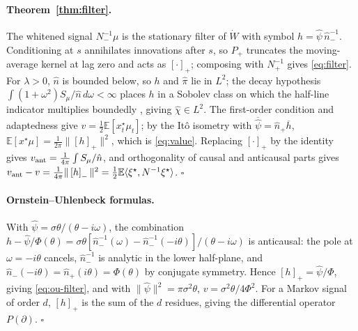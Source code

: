 \documentclass[11pt]{article}
\newcommand{\E}{\mathbb{E}}
\newcommand{\pluspart}[1]{\left[#1\right]_+}
\newcommand{\minuspart}[1]{\left[#1\right]_-}
\theoremstyle{plain}
\theoremstyle{definition}
\theoremstyle{remark}
\begin{document}
\paragraph{Theorem~\ref{thm:filter}.} The whitened signal $N_-^{-1}\mu$ is the stationary filter of $\dot W$ with symbol $h=\hat\psi\,\hat n_-^{-1}$. Conditioning at $s$ annihilates innovations after $s$, so $P_+$ truncates the moving-average kernel at lag zero and acts as $\pluspart{\cdot}$; composing with $N_+^{-1}$ gives \eqref{eq:filter}. For $\lambda>0$, $\hat n$ is bounded below, so $h$ and $\hat\pi$ lie in $L^2$; the decay hypothesis $\int(1+\omega^2)S_\mu/\hat n\,d\omega<\infty$ places $h$ in a Sobolev class on which the half-line indicator multiplies boundedly \citep[Ch.~1]{LionsMagenes1972}, giving $\hat\chi\in L^2$. The first-order condition and adaptedness give $v=\tfrac12\E[x^\star_t\mu_t]$; by the It\^o isometry with $\overline{\hat\psi}=\hat n_+\overline h$, $\E[x^\star\mu]=\tfrac1{2\pi}\|\pluspart{h}\|^2$, which is \eqref{eq:value}. Replacing $\pluspart{\cdot}$ by the identity gives $v_{\rm ant}=\tfrac1{4\pi}\int S_\mu/\hat n$, and orthogonality of causal and anticausal parts gives $v_{\rm ant}-v=\tfrac1{4\pi}\|\minuspart{h}\|^2=\tfrac12\E\langle\xi^\star,N^{-1}\xi^\star\rangle$. $\square$

\paragraph{Ornstein--Uhlenbeck formulas.} With $\hat\psi=\sigma\theta/(\theta-i\omega)$, the combination $h-\hat\psi/\Phi(\theta)=\sigma\theta[\hat n_-^{-1}(\omega)-\hat n_-^{-1}(-i\theta)]/(\theta-i\omega)$ is anticausal: the pole at $\omega=-i\theta$ cancels, $\hat n_-^{-1}$ is analytic in the lower half-plane, and $\hat n_-(-i\theta)=\hat n_+(i\theta)=\Phi(\theta)$ by conjugate symmetry. Hence $\pluspart{h}=\hat\psi/\Phi$, giving \eqref{eq:ou-filter}, and with $\|\hat\psi\|^2=\pi\sigma^2\theta$, $v=\sigma^2\theta/4\Phi^2$. For a Markov signal of order $d$, $\pluspart{h}$ is the sum of the $d$ residues, giving the differential operator $P(\partial)$. $\square$
\end{document}
